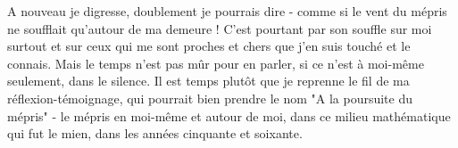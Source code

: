 A nouveau je digresse, doublement je pourrais dire - comme si le vent du mépris ne soufflait qu'autour de ma demeure ! C'est pourtant par son souffle sur moi surtout et sur ceux qui me sont proches et chers que j'en suis touché et le connais. Mais le temps n'est pas mûr pour en parler, si ce n'est à moi-même seulement, dans le silence. Il est temps plutôt que je reprenne le fil de ma réflexion-témoignage, qui pourrait bien prendre le nom "A la poursuite du mépris" - le mépris en moi-même et autour de moi, dans ce milieu mathématique qui fut le mien, dans les années cinquante et soixante.



